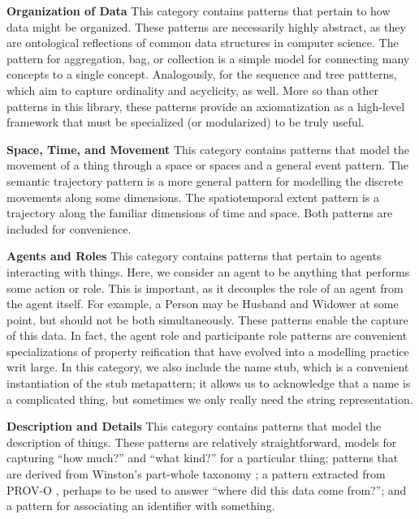 \noindent\textbf{Organization of Data} This category contains patterns that pertain to how data might be organized. These patterns are necessarily highly abstract, as they are ontological reflections of common data structures in computer science. The pattern for aggregation, bag, or collection is a simple model for connecting many concepts to a single concept. Analogously, for the sequence and tree pattterns, which aim to capture ordinality and acyclicity, as well. More so than other patterns in this library, these patterns provide an axiomatization as a high-level framework that must be specialized (or modularized) to be truly useful.

\noindent\textbf{Space, Time, and Movement} This category contains patterns that model the movement of a thing through a space or spaces and a general event pattern. The semantic trajectory pattern is a more general pattern for modelling the discrete movements along some dimensions. The spatiotemporal extent pattern is a trajectory along the familiar dimensions of time and space. Both patterns are included for convenience.

\noindent\textbf{Agents and Roles} This category contains patterns that pertain to agents interacting with things. Here, we consider an agent to be anything that performs some action or role. This is important, as it decouples the role of an agent from the agent itself. For example, a \textsf{Person} may be \textsf{Husband} and \textsf{Widower} at some point, but should not be both simultaneously. These patterns enable the capture of this data. In fact, the agent role and participante role patterns are convenient specializations of property reification that have evolved into a modelling practice writ large. In this category, we also include the name stub, which is a convenient instantiation of the stub metapattern; it allows us to acknowledge that a name is a complicated thing, but sometimes we only really need the string representation.

\noindent\textbf{Description and Details} This category contains patterns that model the description of things. These patterns are relatively straightforward, models for capturing ``how much?'' and ``what kind?'' for a particular thing; patterns that are derived from Winston's part-whole taxonomy \cite{partof}; a pattern extracted from PROV-O \cite{provo}, perhaps to be used to answer ``where did this data come from?''; and a pattern for associating an identifier with something.